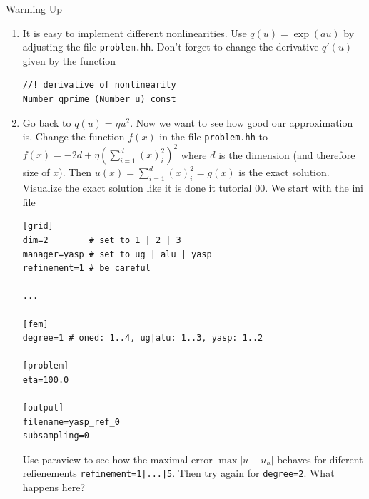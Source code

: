 \documentclass[12pt,a4paper]{article}
\begin{document}
\begin{Exercise}{Warming Up}
\begin{enumerate}
\begin{lstlisting}
[output]
filename=degree1_subsampling0
subsampling=0
\end{lstlisting}
    Try all combinations of \lstinline{degree=1|2} and
    \lstinline{subsampling=1|2} with appropriate
    \lstinline{filename}.  Look at your solutions using paraview and the
    \lstinline{warp by scalar} filter.  You can see the underlying grid
    by choosing \lstinline{surface with edges} instead of
    \lstinline{surface} in the parview drop down menu.  Explain what you
    see.

  \item It is easy to implement different nonlinearities.  Use
    $q(u)=\exp(au)$ by adjusting the file \lstinline{problem.hh}.
    Don't forget to change the derivative $q'(u)$ given by the
    function
    \begin{lstlisting}
//! derivative of nonlinearity
Number qprime (Number u) const
    \end{lstlisting}

  \item Go back to $q(u)=\eta u^2$.  Now we want to see how good our
    approximation is.  Change the function $f(x)$ in the file
    \lstinline{problem.hh} to $f(x)=-2d+\eta(\sum_{i=1}^d(x)_i^2)^2$
    where $d$ is the dimension (and therefore size of $x$).  Then
    $u(x)=\sum_{i=1}^d(x)_i^2=g(x)$ is the exact solution.  Visualize the
    exact solution like it is done it tutorial 00. We start with the
    ini file
    \begin{lstlisting}
[grid]
dim=2        # set to 1 | 2 | 3
manager=yasp # set to ug | alu | yasp
refinement=1 # be careful

...

[fem]
degree=1 # oned: 1..4, ug|alu: 1..3, yasp: 1..2

[problem]
eta=100.0

[output]
filename=yasp_ref_0
subsampling=0
    \end{lstlisting}
    Use paraview to see how the maximal error $\max|u-u_h|$ behaves
    for diferent refienements \lstinline{refinement=1|...|5}.  Then
    try again for \lstinline{degree=2}.  What happens here?
  \end{enumerate}
\end{Exercise}
\end{document}

